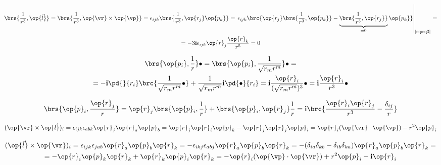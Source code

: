 \begin{equation}
\label{eq:eq4}
\begin{gathered}
\brs{\frac{1}{r^3}, \op{\vec{l}}} = \brs{\frac{1}{r^3}, \op{\vr} \times \op{\vp}} = \epsilon_{ijk} \brs{ \frac{1}{r^3}, \op{r_j}\op{p_k} } = 
\left. \epsilon_{ijk} \brc{ \op{r_j} \brs{ \frac{1}{r^3}, \op{p_k} } - \underbrace { \brs{ \frac{1}{r^3}, \op{r_j} } }_{=0} \op{p_k} } \right|_{\text{\eqref{eq:eq3}}} = \\ = 
-3 \mathbf{i} \epsilon_{ijk} \op{r}_j \frac{\op{r}_k}{r^5} = 0
\end{gathered}
\end{equation}

\begin{equation}
\label{eq:eq5}
\begin{gathered}
\brs{\op{p_i}, \frac{1}{r}} \bullet = \brs{\op{p_i}, \frac{1}{\sqrt{r_m r^m}}} \bullet = \\ = 
-\mathbf{i} \pd{}{r_i} \brc{\frac{1}{\sqrt{r_m r^m}} \bullet} + \frac{1}{\sqrt{r_m r^m}} \mathbf{i} \pd{\bullet}{r_i} = \mathbf{i} \frac{\op{r}_i}{(\sqrt{r_m r^m})^3} \bullet = \mathbf{i} \frac{\op{r}_i}{r^3} \bullet
\end{gathered}
\end{equation}

\begin{equation}
\label{eq:eq6}
\brs{\op{p}_i, \frac{\op{r}_j}{r}} = \op{r}_j \brs{\op{p}_i, \frac{1}{r}} + \brs{\op{p}_i, \op{r}_j} \frac{1}{r} = \mathbf{i} \brc{\frac{\op{r}_i\op{r}_j}{r^3}-\frac{\delta_{ij}}{r}}
\end{equation}

\begin{equation}
\label{eq:eq7}
(\op{\vr} \times \op{\vec{l}})_i = \epsilon_{ijk}\epsilon_{abk} \op{r}_j \op{r}_a \op{p}_b = \op{r}_j \op{r}_i \op{p}_k - \op{r}_j \op{r}_j \op{p}_i = \op{r}_i (\op{\vr} \cdot \op{\vp}) - r^2 \op{p}_i
\end{equation}

\begin{equation}
\label{eq:eq8}
\begin{gathered}
(\op{\vec{l}} \times \op{\vr})_i = \epsilon_{ijk}\epsilon_{jab} \op{r}_a \op{p}_b \op{r}_k = - \epsilon_{ikj}\epsilon_{abj} \op{r}_a \op{p}_b \op{r}_k =
- (\delta_{ia}\delta_{kb} - \delta_{ib}\delta_{ka}) \op{r}_a \op{p}_b \op{r}_k = \\ = - \op{r}_i \op{p}_k \op{r}_k + \op{r}_k \op{p}_i \op{r}_k =
- \op{r}_i (\op{\vp} \cdot \op{\vr}) + r^2 \op{p}_i - \mathbf{i} \op{r}_i
\end{gathered}
\end{equation}

